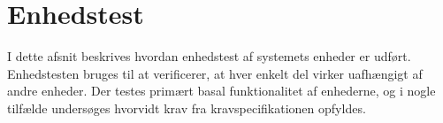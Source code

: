 \chapter{Enhedstest}
I dette afsnit beskrives hvordan enhedstest af systemets enheder er udført. Enhedstesten bruges til at verificerer, at hver enkelt del virker uafhængigt af andre enheder. 
Der testes primært basal funktionalitet af enhederne, og i nogle tilfælde undersøges hvorvidt krav fra kravspecifikationen opfyldes.





\newpage


\newpage


\newpage 


%

\newpage

